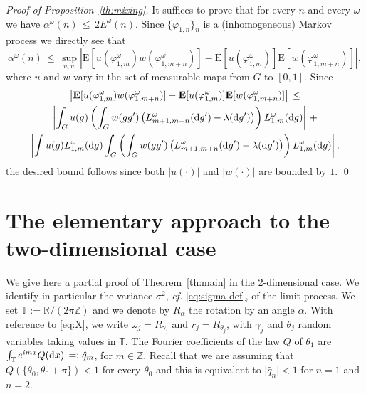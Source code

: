\documentclass[a4paper,reqno,11pt]{amsart}
\numberwithin{equation}{section}
\newcommand{\bbT}{{\ensuremath{\mathbb T}} }
\newcommand{\ga}{\alpha}
\newcommand{\gl}{\lambda}
\newcommand{\gs}{\sigma}
\newcommand{\go}{\omega}
\newcommand{\dd}{\text{\rm d}}             %
\newcommand{\R}{\mathbb{R}}
\newcommand{\Z}{\mathbb{Z}}
\def\bE{\ensuremath{\bs{\mathrm{E}}}}
\def\bs{\boldsymbol}
\renewcommand{\phi}{\varphi}
\begin{document}
\bigskip

\noindent
{\it Proof of Proposition~\ref{th:mixing}.}
It suffices to prove that for every $n$ and every $\go$ we have
$\ga^\go (n) \, \le \,  2E^\go (n) $.
Since $\{\phi_{1,n}\}_{n}$ is a (inhomogeneous) Markov process 
we directly see that
\begin{equation}
    \ga^\go (n) \,\le \, 
    \sup_{u,w}  \left|\bE [u(\phi^\go_{1,m})w(\phi^\go_{1,m+n})]
    -\bE [u(\phi^\go_{1,m})]\bE[w(\phi^\go_{1,m+n})]
    \right|,
\end{equation}
where  $u$ and $w$ vary in the set of  measurable maps from
$G$ to $[0,1]$. Since
\begin{multline}
\left|\bE [u(\phi^\go_{1,m})w(\phi^\go_{1,m+n})]
    -\bE [u(\phi^\go_{1,m})]\bE[w(\phi^\go_{1,m+n})]
    \right|\, \le \\
    \left\vert
 \int_{G} u(g)\left(\int_G w(gg^\prime) \left(L_{m+1,m+n}^\go (\dd g^\prime)
   -\gl (\dd g^\prime)\right)\right) L_{1,m}^\go (\dd g) 
    \right\vert \,+\\
     \left\vert
     \int u(g) L_{1, m}^\go (\dd g)
 \int_{G} \left(\int_G w(gg^\prime) \left(L_{m+1,m+n}^\go (\dd g^\prime)
   -\gl (\dd g^\prime)\right)\right) L_{1,m}^\go (\dd g) 
    \right\vert
   ,
\end{multline}
the desired bound follows since both $\vert u(\cdot)\vert$ and $\vert w(\cdot)\vert$
are bounded by $1$.
\qed


\bigskip

\appendix



\medskip

\section{The elementary approach to the two-dimensional case}

\label{sec:2d}
We give here a partial proof of Theorem~\ref{th:main} in the 2-dimensional case. We identify in particular 
the variance $\gs^2$, {\sl cf.} \eqref{eq:sigma-def}, of the limit process. 
We set $\bbT := \R/(2\pi\Z)$ and we denote by $R_\ga$
the rotation by an angle $\ga$. With reference to \eqref{eq:X}, we write
$\go_j=R_{\gamma_j}$ and $r_j=R_{\theta_j}$, with $\gamma_j$ and
$\theta_j$ random variables taking values in $\bbT$. 
The Fourier coefficients of the law $Q$ of $\theta_1$ are 
$\int_\bbT e^{i m x} Q (\dd x)\, =: \hat{q}_m$, 
for $m\in\Z$. Recall that we are assuming that $Q(\{\theta_0, \theta_0+\pi\})<1$ 
for every $\theta_0$ 
and this is equivalent to $\vert \hat{q}_n\vert <1$ for $n=1$ and $n=2$.
 
\end{document}
